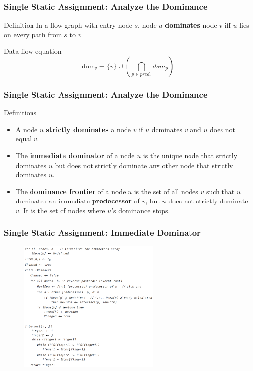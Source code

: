 \documentclass{beamer}
\begin{document}
	\begin{frame}
		\frametitle{Single Static Assignment: Analyze the Dominance}
		\begin{block}{Definition}
			In a flow graph with entry node $s$, node $u$ \textbf{dominates} node $v$ iff $u$ lies on every path from $s$ to $v$
		\end{block}
		\pause
		\begin{alertblock}{Data flow equation}
			\[
				\text{dom}_v = \{v\} \cup \left(\bigcap_{p \in pred_v}{dom_p} \right)
			\]
		\end{alertblock}
	\end{frame}

	\begin{frame}
		\frametitle{Single Static Assignment: Analyze the Dominance}
		\begin{block}{Definitions}
			\begin{itemize}
				\item A node $u$ \textbf{strictly dominates} a node $v$ if $u$ dominates $v$ and $u$ does not equal $v$.
				\item The \textbf{immediate dominator} of a node $u$ is the unique node that strictly dominates $u$ but does not strictly dominate any other node that strictly dominates $u$.
				\item The \textbf{dominance frontier} of a node $u$ is the set of all nodes $v$ such that $u$ dominates an immediate \textbf{predecessor} of $v$, but $u$ does not strictly dominate $v$. It is the set of nodes where $u$'s dominance stops.
			\end{itemize}
		\end{block}
	\end{frame}

	\begin{frame}
		\frametitle{Single Static Assignment: Immediate Dominator}
		\begin{figure}[!htp]
			\includegraphics[height=6.5cm]{image/single-static-assignment/compute-the-dominators}
		\end{figure}
	\end{frame}
\end{document}
